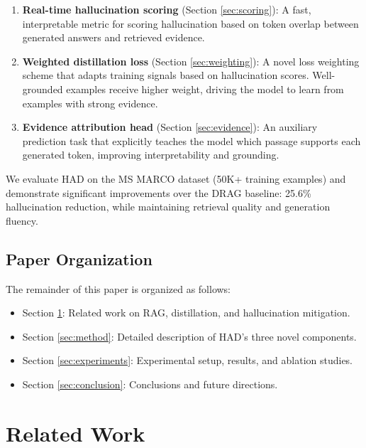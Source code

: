 \documentclass[11pt,a4paper]{article}
\begin{document}
\begin{enumerate}
    \item \textbf{Real-time hallucination scoring} (Section \ref{sec:scoring}): A fast, interpretable metric for scoring hallucination based on token overlap between generated answers and retrieved evidence.
    
    \item \textbf{Weighted distillation loss} (Section \ref{sec:weighting}): A novel loss weighting scheme that adapts training signals based on hallucination scores. Well-grounded examples receive higher weight, driving the model to learn from examples with strong evidence.
    
    \item \textbf{Evidence attribution head} (Section \ref{sec:evidence}): An auxiliary prediction task that explicitly teaches the model which passage supports each generated token, improving interpretability and grounding.
\end{enumerate}

We evaluate HAD on the MS MARCO dataset (50K+ training examples) and demonstrate significant improvements over the DRAG baseline: 25.6\% hallucination reduction, while maintaining retrieval quality and generation fluency.

\subsection{Paper Organization}

The remainder of this paper is organized as follows:
\begin{itemize}
    \item Section \ref{sec:related}: Related work on RAG, distillation, and hallucination mitigation.
    \item Section \ref{sec:method}: Detailed description of HAD's three novel components.
    \item Section \ref{sec:experiments}: Experimental setup, results, and ablation studies.
    \item Section \ref{sec:conclusion}: Conclusions and future directions.
\end{itemize}

\section{Related Work}
\label{sec:related}
\end{document}
